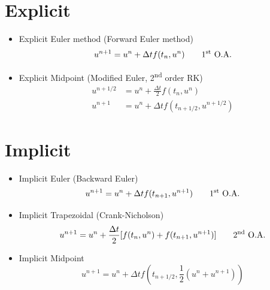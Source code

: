 \documentclass[oneside,a4paper,11pt]{report}
\begin{document}
\section{Explicit}
\begin{itemize}

\item Explicit Euler method (Forward Euler method)
\begin{equation}
u^{n+1} = u^n + \Delta t f(t_n, u^n) \qquad \text{1\textsuperscript{st} O.A.}
\end{equation}

\item Explicit Midpoint (Modified Euler, 2\textsuperscript{nd} order RK)
\begin{align}
    u^{n+1/2} &= u^n + \frac{\Delta t}{2} f(t_n, u^n) \nonumber \\
    u^{n+1}   &= u^n + \Delta t f(t_{n+1/2}, u^{n+1/2})
\end{align}

\end{itemize}

\section{Implicit}
\begin{itemize}

\item Implicit Euler (Backward Euler)
\begin{equation}
u^{n+1} = u^n + \Delta t f(t_{n+1}, u^{n+1}) \qquad \text{1\textsuperscript{st} O.A.}
\end{equation}

\item Implicit Trapezoidal (Crank-Nicholson)
\begin{equation}
u^{n+1} = u^n + \frac{\Delta t}{2} [ f(t_n, u^n) + f(t_{n+1}, u^{n+1}) ] \qquad \text{2\textsuperscript{nd} O.A.}
\end{equation}

\item Implicit Midpoint
\begin{equation}
    u^{n+1} = u^n + \Delta t f\left (t_{n+1/2}, \frac{1}{2} \left (u^n + u^{n+1} \right ) \right )
\end{equation}

\end{itemize}
\end{document}
